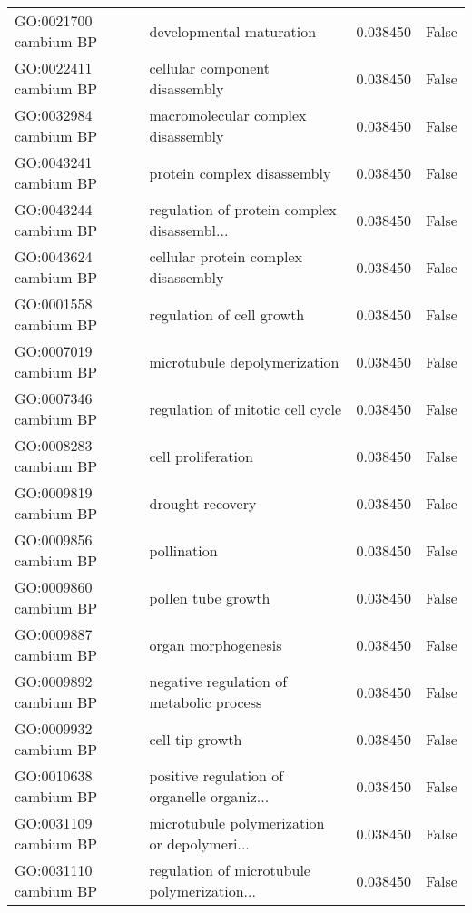 \begin{tabular}{llrl}
GO:0021700 cambium BP       &                     developmental maturation &       0.038450 &  False \\
GO:0022411 cambium BP       &               cellular component disassembly &       0.038450 &  False \\
GO:0032984 cambium BP       &           macromolecular complex disassembly &       0.038450 &  False \\
GO:0043241 cambium BP       &                  protein complex disassembly &       0.038450 &  False \\
GO:0043244 cambium BP       &  regulation of protein complex disassembl... &       0.038450 &  False \\
GO:0043624 cambium BP       &         cellular protein complex disassembly &       0.038450 &  False \\
GO:0001558 cambium BP       &                    regulation of cell growth &       0.038450 &  False \\
GO:0007019 cambium BP       &                 microtubule depolymerization &       0.038450 &  False \\
GO:0007346 cambium BP       &             regulation of mitotic cell cycle &       0.038450 &  False \\
GO:0008283 cambium BP       &                           cell proliferation &       0.038450 &  False \\
GO:0009819 cambium BP       &                             drought recovery &       0.038450 &  False \\
GO:0009856 cambium BP       &                                  pollination &       0.038450 &  False \\
GO:0009860 cambium BP       &                           pollen tube growth &       0.038450 &  False \\
GO:0009887 cambium BP       &                          organ morphogenesis &       0.038450 &  False \\
GO:0009892 cambium BP       &     negative regulation of metabolic process &       0.038450 &  False \\
GO:0009932 cambium BP       &                              cell tip growth &       0.038450 &  False \\
GO:0010638 cambium BP       &  positive regulation of organelle organiz... &       0.038450 &  False \\
GO:0031109 cambium BP       &  microtubule polymerization or depolymeri... &       0.038450 &  False \\
GO:0031110 cambium BP       &  regulation of microtubule polymerization... &       0.038450 &  False \\

\end{tabular}
